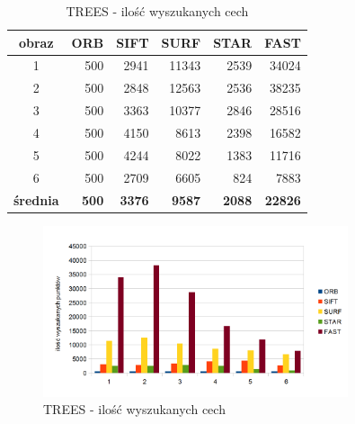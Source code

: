 \begin{table}[htbp]
  \centering
  \caption{TREES - ilość wyszukanych cech}
    \begin{tabular}{|c|r|r|r|r|r|}\hline
    
    obraz & \textbf{ORB} & \textbf{SIFT} & \textbf{SURF} & \textbf{STAR} & \textbf{FAST} \\\hline
    
   
    1 & 500 & 2941 & 11343 & 2539 & 34024 \\
    2 & 500 & 2848 & 12563 & 2536 & 38235 \\
    3 & 500 & 3363 & 10377 & 2846 & 28516 \\
    4 & 500 & 4150 & 8613 & 2398 & 16582 \\
    5 & 500 & 4244 & 8022 & 1383 & 11716 \\
    6 & 500 & 2709 & 6605 & 824 & 7883 \\\hline
    \textbf{średnia} & \textbf{500} & \textbf{3376} & \textbf{9587} & \textbf{2088} & \textbf{22826} \\
   \hline
    \end{tabular}%
  \label{tab:trees_f1}%
\end{table}%


\begin{figure}
\centering
\includegraphics[width=0.8\textwidth]{pict/mikolajczyk/trees/f1.png}
\caption{TREES - ilość wyszukanych cech}
\label{fig:trees_f1}
\end{figure}


